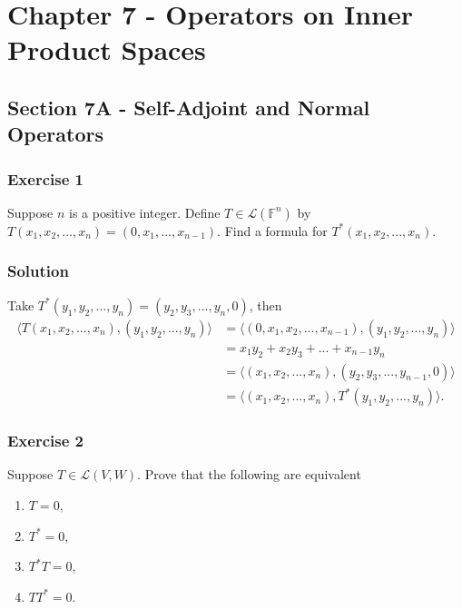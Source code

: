 \section*{Chapter 7 - Operators on Inner Product Spaces}

\subsection*{Section 7A - Self-Adjoint and Normal Operators}

\subsubsection*{Exercise 1}

Suppose $n$ is a positive integer.
Define $T \in \mathcal{L}(\mathbb{F}^n)$ by $T(x_1, x_2, ..., x_n) = (0, x_1, ..., x_{n-1})$.
Find a formula for $T^*(x_1, x_2, ..., x_n)$.

\subsubsection*{Solution}

Take $T^*(y_1, y_2, ..., y_n) = (y_2, y_3, ..., y_n, 0)$, then
\begin{equation*}
    \begin{split}
        \langle T(x_1, x_2, ..., x_n), (y_1, y_2, ..., y_n) \rangle
            &= \langle (0, x_1, x_2, ..., x_{n-1}), (y_1, y_2, ..., y_n) \rangle \\
            &= x_1 y_2 + x_2 y_3 + ... + x_{n-1} y_n \\
            &= \langle (x_1, x_2, ..., x_n), (y_2, y_3, ..., y_{n-1}, 0) \rangle \\
            &= \langle (x_1, x_2, ..., x_n), T^*(y_1, y_2, ..., y_n) \rangle.
    \end{split}
\end{equation*}


\subsubsection*{Exercise 2}

Suppose $T \in \mathcal{L}(V, W)$.
Prove that the following are equivalent
\begin{enumerate}
\item $T = 0$,
\item $T^* = 0$,
\item $T^* T = 0$,
\item $T T^* = 0$.
\end{enumerate}

